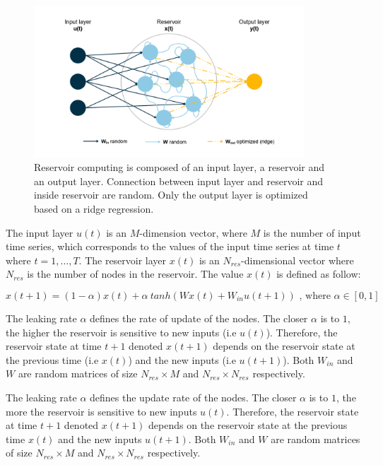 \documentclass[
  11pt,
  a4paper,
]{article}
\theoremstyle{plain}
\theoremstyle{remark}
\begin{document}
\begin{figure}[H]

{\centering \includegraphics[width=0.9\textwidth,height=\textheight]{images/image1.png}

}

\caption{Reservoir computing is composed of an input layer, a reservoir
and an output layer. Connection between input layer and reservoir and
inside reservoir are random. Only the output layer is optimized based on
a ridge regression.}

\end{figure}%

The input layer \(u(t)\) is an \(M\)-dimension vector, where \(M\) is
the number of input time series, which corresponds to the values of the
input time series at time \(t\) where \(t = 1, …, T\). The reservoir
layer \(x(t)\) is an \(N_{res}\)-dimensional vector where \(N_{res}\) is
the number of nodes in the reservoir. The value \(x(t)\) is defined as
follow:

\[x( t+1 ) = ( 1 - \alpha )  x ( t) + \alpha \: tanh( W x(t) + W_{in} u(t+1) ) \text{ , where } \alpha \in [0, 1 ]\]

The leaking rate \(\alpha\) defines the rate of update of the nodes. The
closer \(\alpha\) is to \(1\), the higher the reservoir is sensitive to
new inputs (i.e \(u(t)\)). Therefore, the reservoir state at time
\(t+1\) denoted \(x(t+1)\) depends on the reservoir state at the
previous time (i.e \(x(t)\)) and the new inputs (i.e \(u(t+1)\)). Both
\(W_{in}\) and \(W\) are random matrices of size \(N_{res} \times M\)
and \(N_{res} \times N_{res}\) respectively.

The leaking rate \(\alpha\) defines the update rate of the nodes. The
closer \(\alpha\) is to \(1\), the more the reservoir is sensitive to
new inputs \(u(t)\). Therefore, the reservoir state at time \(t+1\)
denoted \(x(t+1)\) depends on the reservoir state at the previous time
\(x(t)\) and the new inputs \(u(t+1)\). Both \(W_{in}\) and \(W\) are
random matrices of size \(N_{res} \times M\) and
\(N_{res} \times N_{res}\) respectively.
\end{document}
